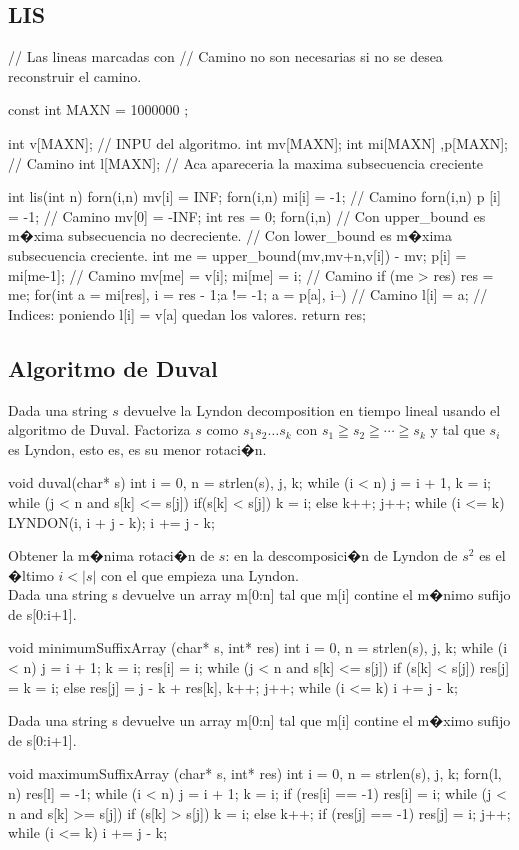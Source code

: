 \documentclass[10pt,landscape,twocolumn,a4paper,notitlepage]{article}
\begin{document}
\subsection{LIS}
\begin{code}
// Las lineas marcadas con // Camino no son necesarias si no se desea reconstruir el camino.

const int MAXN = 1000000 ;

int v[MAXN]; // INPU del algoritmo.
int mv[MAXN];
int mi[MAXN] ,p[MAXN]; // Camino
int l[MAXN]; // Aca apareceria la maxima subsecuencia creciente

int lis(int n) {
	forn(i,n) mv[i] = INF;
	forn(i,n) mi[i] = -1; // Camino
	forn(i,n) p [i] = -1; // Camino
	mv[0] = -INF;
	int res = 0;
	forn(i,n) {
		// Con upper_bound es m�xima subsecuencia no decreciente.
		// Con lower_bound es m�xima subsecuencia creciente.
		int me = upper_bound(mv,mv+n,v[i]) - mv;
		p[i] = mi[me-1]; // Camino
		mv[me] = v[i];
		mi[me] = i; // Camino
		if (me > res) res = me;
	}
	for(int a = mi[res], i = res - 1;a != -1; a = p[a], i--) // Camino
		l[i] = a; // Indices: poniendo l[i] = v[a] quedan los valores.
	return res;
}
\end{code}
\subsection{Algoritmo de Duval}
    Dada una string $s$ devuelve la Lyndon decomposition en tiempo lineal usando el algoritmo de Duval.
    Factoriza $s$ como $s_1 s_2 \ldots s_k$ con $s_1 \geqq s_2 \geqq \cdots \geqq s_k$ y tal que $s_i$ es Lyndon, esto es, es su menor rotaci�n.
\begin{code}
void duval(char* s) {   
    int i = 0, n = strlen(s), j, k;
    while (i < n) {
        j = i + 1, k = i;
        while (j < n and s[k] <= s[j]) {
            if(s[k] < s[j]) k = i; else k++; j++; }
        while (i <= k) {
        		LYNDON(i, i + j - k); i += j - k; }}}
\end{code}
\noindent Obtener la m�nima rotaci�n de $s$: en la descomposici�n de Lyndon de $s^2$ es el �ltimo $i<|s|$ con el que empieza una Lyndon.\\
\noindent Dada una string s devuelve un array m[0:n] tal que m[i] contine el m�nimo sufijo de s[0:i+1].
\begin{code}
void minimumSuffixArray (char* s, int* res) {
    int i = 0, n = strlen(s), j, k;
    while (i < n) {
        j = i + 1; k = i; res[i] = i;
        while (j < n and s[k] <= s[j]) {
            if (s[k] < s[j]) res[j] = k = i;
            else res[j] = j - k + res[k], k++; j++; }
        while (i <= k) i += j - k; }}
\end{code}
\noindent Dada una string s devuelve un array m[0:n] tal que m[i] contine el m�ximo sufijo de s[0:i+1].
\begin{code}
void maximumSuffixArray (char* s, int* res) {
    int i = 0, n = strlen(s), j, k; forn(l, n) res[l] = -1;
    while (i < n) {
        j = i + 1; k = i;
        if (res[i] == -1) res[i] = i;
        while (j < n and s[k] >= s[j]) {
            if (s[k] > s[j]) k = i; else k++;
            if (res[j] == -1) res[j] = i; j++; }
        while (i <= k) i += j - k; }}
\end{code}
\end{document}
